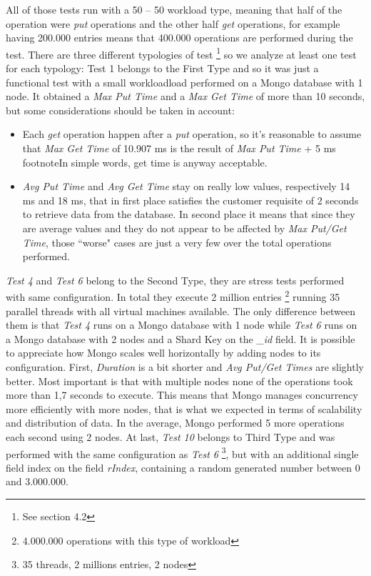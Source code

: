 All of those tests run with a 50 – 50 workload type, meaning that half of the operation were \textit{put} operations and the other half \textit{get} operations, for example having 200.000 entries means that 400.000 operations are performed during the test.
There are three different typologies of test \footnote{See section 4.2} so we analyze at least one test for each typology: Test 1 belongs to the First Type and so it was just a functional test with a small workloadload performed on a Mongo database with 1 node. It obtained a \textit{Max Put Time} and a \textit{Max Get Time} of more than 10 seconds, but some considerations should be taken in account:
\begin{itemize}
	\item Each \textit{get} operation happen after a \textit{put} operation, so it’s reasonable to assume that \textit{Max Get Time} of 10.907 ms is  the result of \textit{Max Put Time} + 5 ms footnote{In simple words, get time is anyway acceptable}.
	\item \textit{Avg Put Time} and \textit{Avg Get Time} stay on really low values, respectively 14 ms and 18 ms, that in first place satisfies the customer requisite of 2 seconds to retrieve data from the database. In second place it means that since they are average values and they do not appear to be affected by \textit{Max Put/Get Time},  those “worse" cases are just a very few over the total operations performed.
\end{itemize}
\textit{Test 4} and \textit{Test 6} belong to the Second Type, they are stress tests performed with same configuration. In total they execute 2 million entries \footnote {4.000.000 operations with this type of workload} running 35 parallel threads with all virtual machines available. The only difference between them is that \textit{Test 4} runs on a Mongo database with 1 node while \textit{Test 6} runs on a Mongo database with 2 nodes and a Shard Key on the \textit{\_id} field.
It is possible to appreciate how Mongo scales well horizontally by adding nodes to its configuration. First, \textit{Duration} is a bit shorter and \textit{Avg Put/Get Times} are slightly better. Most important is that with multiple nodes none of the operations took more than 1,7 seconds to execute. This means that Mongo manages concurrency more efficiently with more nodes, that is what we expected in terms of scalability and distribution of data. In the average, Mongo performed 5 more operations each second using 2 nodes.
At last, \textit{Test 10} belongs to Third Type and was performed with the same configuration as \textit{Test 6} \footnote{35 threads, 2 millions entries, 2 nodes}, but with an additional single field index on the field \textit{rIndex}, containing a random generated number between 0 and 3.000.000.
